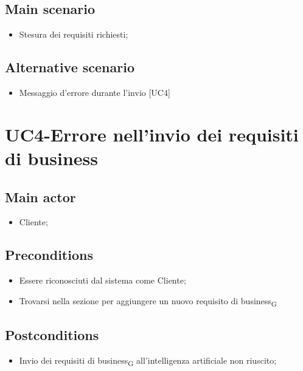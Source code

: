 \documentclass{article}
\begin{document}
     \subsection*{Main scenario}

        \begin{itemize}
            \item Stesura dei requisiti richiesti;
        \end{itemize}
     \subsection*{Alternative scenario}
        \begin{itemize}
            \item Messaggio d'errore durante l'invio [UC4]
        \end{itemize}

\section{UC4-Errore nell'invio dei requisiti di business}

     \subsection*{Main actor}
     \begin{itemize}
         \item Cliente;
     \end{itemize}
     \subsection*{Preconditions} 
     \begin{itemize}
         \item Essere riconosciuti dal sistema come Cliente;
         \item Trovarsi nella sezione per aggiungere un nuovo requisito di business\textsubscript{G} 
     \end{itemize}
     \subsection*{Postconditions} 
        \begin{itemize}
            \item Invio dei requisiti di business\textsubscript{G}  all'intelligenza artificiale non riuscito;
        \end{itemize}
\end{document}
